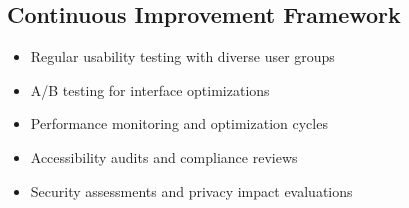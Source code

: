 \documentclass[12pt,a4paper]{article}
\begin{document}
\subsection{Continuous Improvement Framework}

\begin{itemize}
    \item Regular usability testing with diverse user groups
    \item A/B testing for interface optimizations
    \item Performance monitoring and optimization cycles
    \item Accessibility audits and compliance reviews
    \item Security assessments and privacy impact evaluations
\end{itemize}
\end{document}
